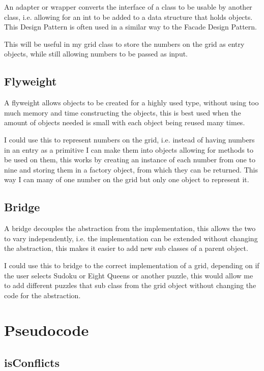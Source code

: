 \documentclass[]{final_report}
\begin{document}
An adapter or wrapper converts the interface of a class to be usable by another class, i.e. allowing for an int to be added to a data structure that holds objects. This Design Pattern is often used in a similar way to the Facade Design Pattern.

This will be useful in my grid class to store the numbers on the grid as entry objects, while still allowing numbers to be passed as input.

\subsection*{Flyweight}

A flyweight allows objects to be created for a highly used type, without using too much memory and time constructing the objects, this is best used when the amount of objects needed is small with each object being reused many times.

I could use this to represent numbers on the grid, i.e. instead of having numbers in an entry as a primitive I can make them into objects allowing for methods to be used on them, this works by creating an instance of each number from one to nine and storing them in a factory object, from which they can be returned. This way I can many of one number on the grid but only one object to represent it.

\subsection*{Bridge}

A bridge decouples the abstraction from the implementation, this allows the two to vary independently, i.e. the implementation can be extended without changing the abstraction, this makes it easier to add new sub classes of a parent object.

I could use this to bridge to the correct implementation of a grid, depending on if the user selects Sudoku or Eight Queens or another puzzle, this would allow me to add different puzzles that sub class from the grid object without changing the code for the abstraction.

\section*{Pseudocode}

\subsection*{isConflicts}
\end{document}
